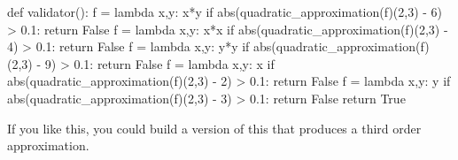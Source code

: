 \documentclass{ximera}
\begin{document}
\begin{question}
\begin{solution}
\begin{python}
def validator():
  f = lambda x,y: x*y
  if abs(quadratic_approximation(f)(2,3) - 6) > 0.1:
    return False
  f = lambda x,y: x*x
  if abs(quadratic_approximation(f)(2,3) - 4) > 0.1:
    return False
  f = lambda x,y: y*y
  if abs(quadratic_approximation(f)(2,3) - 9) > 0.1:
    return False
  f = lambda x,y: x
  if abs(quadratic_approximation(f)(2,3) - 2) > 0.1:
    return False
  f = lambda x,y: y
  if abs(quadratic_approximation(f)(2,3) - 3) > 0.1:
    return False
  return True
    \end{python}
  \end{solution}

  If you like this, you could build a version of this that produces a third order approximation.
  
\end{question}
\end{document}

